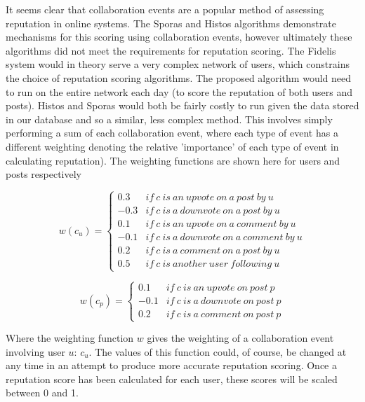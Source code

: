 It seems clear that collaboration events are a popular method of assessing reputation in online systems. The Sporas and Histos algorithms demonstrate mechanisms for this scoring using collaboration events, however ultimately these algorithms did not meet the requirements for reputation scoring. The Fidelis system would in theory serve a very complex network of users, which constrains the choice of reputation scoring algorithms. The proposed algorithm would need to run on the entire network each day (to score the reputation of both users and posts). Histos and Sporas would both be fairly costly to run given the data stored in our database and so a similar, less complex method. This involves simply performing a sum of each collaboration event, where each type of event has a different weighting denoting the relative 'importance' of each type of event in calculating reputation). The weighting functions are shown here for users and posts respectively

\begin{equation}
	\label{eq:rep_weight_user}
		w(c_u) = \left\{\begin{matrix}
			0.3 & if\ c\ is\ an\ upvote\ on\ a\ post\ by\ u\\ 
			-0.3 & if\ c\ is\ a\ downvote\ on\ a\ post\ by\ u \\ 
			0.1 & if\ c\ is\ an\ upvote\ on\ a\ comment\ by\ u \\ 
			-0.1 & if\ c\ is\ a\ downvote\ on\ a\ comment\ by\ u \\ 
			0.2 & if\ c\ is\ a\ comment\ on\ a\ post\ by\ u\\ 
			0.5 & if\ c\ is\ another\ user\ following\ u
		\end{matrix}\right.
\end{equation}
		
\begin{equation}
	\label{eq:rep_weight_post}
	 w(c_p) = \left\{\begin{matrix}
			0.1 & if\ c\ is\ an\ upvote\ on\ post\ p \\ 
			-0.1 & if\ c\ is\ a\ downvote\ on\ post\ p \\ 
			0.2 & if\ c\ is\ a\ comment\ on\ post\ p
	\end{matrix}\right.
\end{equation}

\noindent
Where the weighting function \(w\) gives the weighting of a collaboration event involving user \(u\): \(c_u\). The values of this function could, of course, be changed at any time in an attempt to produce more accurate reputation scoring. Once a reputation score has been calculated for each user, these scores will be scaled between 0 and 1.

